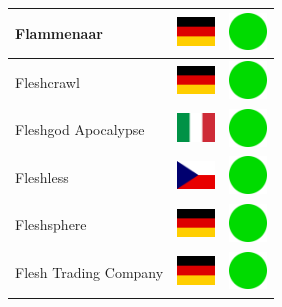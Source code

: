 \documentclass[12pt, a4paper, twoside]{report}
\begin{document}
\begin{center}
\begin{longtable}{|p{5cm}|p{2cm}|p{2cm}|}
 Flammenaar                                                 & \includegraphics[width=1cm]{../img/flags/de} &   \includegraphics[width=1cm]{../likes/y} \\ \hline
 Fleshcrawl                                                 & \includegraphics[width=1cm]{../img/flags/de} &   \includegraphics[width=1cm]{../likes/y} \\ \hline
 Fleshgod Apocalypse                                        & \includegraphics[width=1cm]{../img/flags/it} &   \includegraphics[width=1cm]{../likes/y} \\ \hline
 Fleshless                                                  & \includegraphics[width=1cm]{../img/flags/cz} &   \includegraphics[width=1cm]{../likes/y} \\ \hline
 Fleshsphere                                                & \includegraphics[width=1cm]{../img/flags/de} &   \includegraphics[width=1cm]{../likes/y} \\ \hline
 Flesh Trading Company                                      & \includegraphics[width=1cm]{../img/flags/de} &   \includegraphics[width=1cm]{../likes/y} \\ \hline

\end{longtable}
\end{center}
\end{document}
